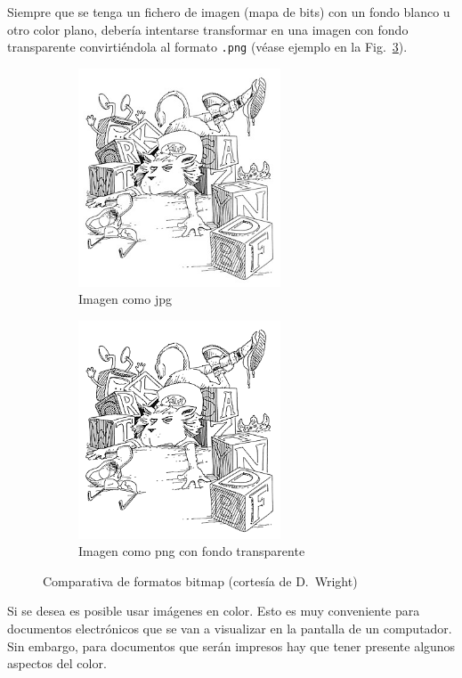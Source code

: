 \documentclass[11pt,a4paper]{article}
\begin{document}
Siempre que se tenga un fichero de imagen (mapa de bits) con un fondo blanco u otro color plano, debería intentarse transformar en una imagen con fondo transparente convirtiéndola al formato \texttt{.png} (véase ejemplo en la Fig.~\ref{fig:lion}).


\begin{figure}[htb]
	\centering
  	\begin{subfigure}[b]{0.4\linewidth}
  		\centering
		\includegraphics[width=6cm]{lionL.jpg}
		\caption{Imagen como jpg}\label{fig:lionLjpg}
  	\end{subfigure}
  	\begin{subfigure}[b]{0.4\linewidth}
  		\centering
		\includegraphics[width=6cm]{lionL.png}
		\caption{Imagen como png con fondo transparente}\label{fig:lionpng}
  	\end{subfigure}
  	\caption[Comparación jpg y png con transparencia]{Comparativa de formatos bitmap (cortesía de D.~Wright)}
	\label{fig:lion}
\end{figure}

Si se desea es posible usar imágenes en color. Esto es muy conveniente para documentos electrónicos que se van a visualizar en la pantalla de un computador. Sin embargo, para documentos que serán impresos hay que tener presente algunos aspectos del color. 
\end{document}
